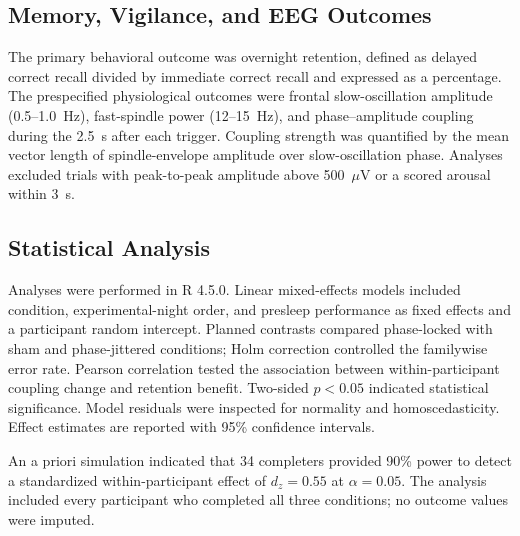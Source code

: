 \subsection{Memory, Vigilance, and EEG Outcomes}

The primary behavioral outcome was overnight retention, defined as delayed correct recall divided by immediate correct recall and expressed as a percentage. The prespecified physiological outcomes were frontal slow-oscillation amplitude (0.5--1.0~Hz), fast-spindle power (12--15~Hz), and phase--amplitude coupling during the 2.5~s after each trigger. Coupling strength was quantified by the mean vector length of spindle-envelope amplitude over slow-oscillation phase. Analyses excluded trials with peak-to-peak amplitude above 500~$\mu$V or a scored arousal within 3~s.

\subsection{Statistical Analysis}

Analyses were performed in R 4.5.0. Linear mixed-effects models included condition, experimental-night order, and presleep performance as fixed effects and a participant random intercept. Planned contrasts compared phase-locked with sham and phase-jittered conditions; Holm correction controlled the familywise error rate. Pearson correlation tested the association between within-participant coupling change and retention benefit. Two-sided $p<0.05$ indicated statistical significance. Model residuals were inspected for normality and homoscedasticity. Effect estimates are reported with 95\% confidence intervals.

An a priori simulation indicated that 34 completers provided 90\% power to detect a standardized within-participant effect of $d_z=0.55$ at $\alpha=0.05$. The analysis included every participant who completed all three conditions; no outcome values were imputed.

